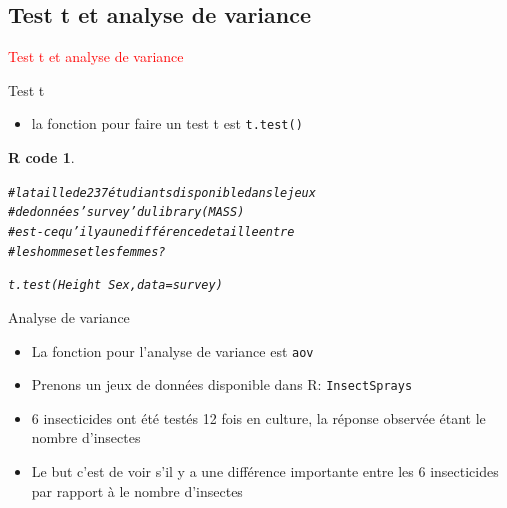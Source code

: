 \documentclass[11pt]{beamer}\usepackage[]{graphicx}\usepackage[]{color}
\makeatletter
\newcommand{\hlcom}[1]{\textcolor[rgb]{0.588,0.588,0.588}{#1}}%
\newcommand{\hlopt}[1]{\textcolor[rgb]{0.196,0.196,0.196}{#1}}%
\newcommand{\hlstd}[1]{\textcolor[rgb]{0.196,0.196,0.196}{#1}}%
\newcommand{\hlkwc}[1]{\textcolor[rgb]{0,0.631,0.314}{#1}}%
\newcommand{\hlkwd}[1]{\textcolor[rgb]{0.78,0.227,0.412}{#1}}%
\newenvironment{kframe}{%
 \def\at@end@of@kframe{}%
 \ifinner\ifhmode%
  \def\at@end@of@kframe{\end{minipage}}%
  \begin{minipage}{\columnwidth}%
 \fi\fi%
 \def\FrameCommand##1{\hskip\@totalleftmargin \hskip-\fboxsep
 \colorbox{shadecolor}{##1}\hskip-\fboxsep
     \hskip-\linewidth \hskip-\@totalleftmargin \hskip\columnwidth}%
 \MakeFramed {\advance\hsize-\width
   \@totalleftmargin\z@ \linewidth\hsize
   \@setminipage}}%
 {\par\unskip\endMakeFramed%
 \at@end@of@kframe}
\newenvironment{knitrout}{}{} %
\newtheorem{rcode}{R code}[section]
\newcommand{\code}[1]{\texttt{#1}}
\makeatother
\begin{document}
\subsection{Test t et analyse de variance}

\begin{frame}
 \begin{center}
  \Huge{\textcolor{red}{Test t et analyse de variance}}
 \end{center}
\end{frame}



\begin{frame}[fragile]{Test t}

\begin{itemize}
  \setlength\itemsep{1.5em}
  \item la fonction pour faire un test t est \code{t.test()}
\end{itemize}
\pause 
\begin{knitrout}
\color{fgcolor}\begin{kframe}
\begin{rcode}\label{unnamed-chunk-39}\begin{alltt}
\hlcom{# la taille de 237 étudiants disponible dans le jeux}
\hlcom{# de données 'survey' du library(MASS)}
\hlcom{# est-ce qu'il y a une différence de taille entre}
\hlcom{# les hommes et les femmes?}

\hlkwd{t.test}\hlstd{(Height} \hlopt{~} \hlstd{Sex,} \hlkwc{data} \hlstd{= survey)}
\end{alltt}
\end{rcode}\end{kframe}
\end{knitrout}

\end{frame}







\begin{frame}[fragile]{Analyse de variance}

\begin{itemize}
  \setlength\itemsep{2em}
\item La fonction pour l'analyse de variance est \code{aov}
\pause \item Prenons un jeux de données disponible dans R: \code{InsectSprays}
\pause \item 6 insecticides ont été testés 12 fois en culture, la réponse observée étant le nombre d'insectes
\pause \item Le but c'est de voir s'il y a une différence importante entre les 6 insecticides par rapport à le nombre d'insectes
\end{itemize}


\end{frame}
\end{document}
